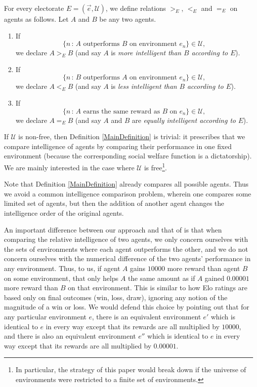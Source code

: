 \documentclass[twoside,11pt]{article}
\begin{document}
\begin{definition}
\label{MainDefinition}
    For every electorate $E=(\vec{e},\mathscr U)$,
    we define relations $>_{E}$, $<_{E}$ and $=_{E}$ on agents as follows.
    Let $A$ and $B$ be any two agents.
    \begin{enumerate}
        \item
        If
        \[
            \{n\,:\,\mbox{$A$ outperforms $B$ on environment $e_n$}\}\in\mathscr U,
        \]
        we declare $A>_{E}B$
        (and say $A$ is \emph{more intelligent than $B$ according to $E$}).
        \item
        If
        \[
            \{n\,:\,\mbox{$B$ outperforms $A$ on environment $e_n$}\}\in\mathscr U,
        \]
        we declare $A<_{E}B$
        (and say $A$ is \emph{less intelligent than $B$ according to $E$}).
        \item
        If
        \[
            \{n\,:\,\mbox{$A$ earns the same reward as $B$ on $e_n$}\}\in\mathscr U,
        \]
        we declare $A=_{E}B$
        (and say $A$ and $B$ are \emph{equally intelligent according to $E$}).
    \end{enumerate}
\end{definition}

If $\mathscr U$ is non-free, then Definition \ref{MainDefinition} is trivial:
it prescribes that we compare intelligence of agents by comparing their
performance in one fixed environment (because the corresponding social welfare
function is a dictatorship). We are mainly interested in the case where $\mathscr U$
is free\footnote{In particular, the strategy of this paper would break
down if the universe of environments were restricted to a finite set of environments.}.

Note that Definition \ref{MainDefinition} already compares all possible agents.
Thus we avoid a common intelligence comparison problem, wherein one compares some
limited set of agents, but then the addition of another agent changes the
intelligence order of the original agents.

An important difference between our approach and that of \citet{hutter2007}
is that when comparing the relative intelligence of two agents, we only concern ourselves
with the sets of environments where each agent outperforms the other, and we do not
concern ourselves with the numerical difference of the two agents' performance in any
environment. Thus, to us, if agent $A$ gains $10000$ more reward than agent $B$ on some
environment, that only helps $A$ the same amount as if $A$ gained $0.00001$ more reward
than $B$ on that environment.
This is similar to how Elo ratings are based only on final outcomes (win, loss, draw),
ignoring any notion of the magnitude of a win or loss.
We would defend this choice by pointing out that for any
particular environment $e$, there is an equivalent environment $e'$ which is identical to
$e$ in every way except that its rewards are all multiplied by $10000$, and there is also
an equivalent environment $e''$ which is identical to $e$ in every way except that its
rewards are all multiplied by $0.00001$.
\end{document}
